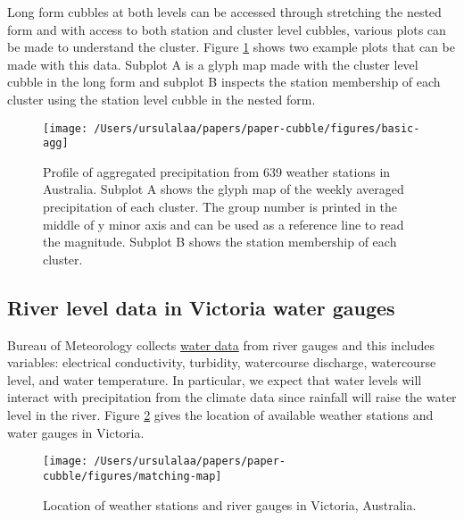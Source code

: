 \documentclass{article}
\begin{document}
Long form cubbles at both levels can be accessed through stretching the nested form and with access to both station and cluster level cubbles, various plots can be made to understand the cluster. Figure \ref{fig:basic-agg} shows two example plots that can be made with this data. Subplot A is a glyph map made with the cluster level cubble in the long form and subplot B inspects the station membership of each cluster using the station level cubble in the nested form.

\begin{figure}
\texttt{[image: /Users/ursulalaa/papers/paper-cubble/figures/basic-agg]} \caption{Profile of aggregated precipitation from 639 weather stations in Australia. Subplot A shows the glyph map of the weekly averaged precipitation of each cluster. The group number is printed in the middle of y minor axis and can be used as a reference line to read the magnitude. Subplot B shows the station membership of each cluster.}\label{fig:basic-agg}
\end{figure}

\hypertarget{river-level-data-in-victoria-water-gauges}{%
\subsection{River level data in Victoria water gauges}\label{river-level-data-in-victoria-water-gauges}}

Bureau of Meteorology collects \href{http://www.bom.gov.au/metadata/catalogue/19115/ANZCW0503900528?template=full}{water data} from river gauges and this includes variables: electrical conductivity, turbidity, watercourse discharge, watercourse level, and water temperature. In particular, we expect that water levels will interact with precipitation from the climate data since rainfall will raise the water level in the river. Figure \ref{fig:matching-map} gives the location of available weather stations and water gauges in Victoria.

\begin{figure}
\texttt{[image: /Users/ursulalaa/papers/paper-cubble/figures/matching-map]} \caption{Location of weather stations and river gauges in Victoria, Australia.}\label{fig:matching-map}
\end{figure}
\end{document}
